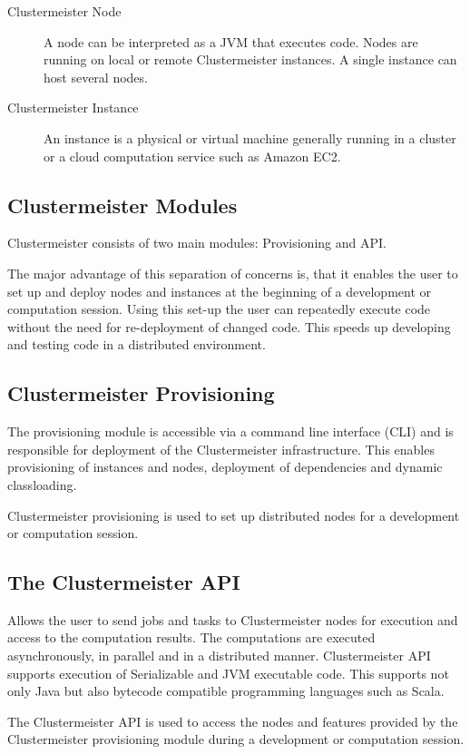 \documentclass{article}
\begin{document}
\begin{description}
\item[Clustermeister Node] A node can be interpreted as a JVM that executes code. Nodes are running on local or remote Clustermeister instances. A single instance can host several nodes.
\item[Clustermeister Instance] An instance is a physical or virtual machine generally running in a cluster or a cloud computation service such as Amazon EC2.
\end{description}

\subsection{Clustermeister Modules}

Clustermeister consists of two main modules: Provisioning and API.

The major advantage of this separation of concerns is, that it enables the user to set up and deploy nodes and instances at the beginning of a development or computation session. Using this set-up the user can repeatedly execute code without the need for re-deployment of changed code. This speeds up developing and testing code in a distributed environment.

\subsection{Clustermeister Provisioning}
The provisioning module is accessible via a command line interface (CLI) and is responsible for deployment of the Clustermeister infrastructure. This enables provisioning of instances and nodes, deployment of dependencies and dynamic classloading.

Clustermeister provisioning is used to set up distributed nodes for a development or computation session.

\subsection{The Clustermeister API}
Allows the user to send jobs and tasks to Clustermeister nodes for execution and access to the computation results. The computations are executed asynchronously, in parallel and in a distributed manner. Clustermeister API supports execution of Serializable and JVM executable code. This supports not only Java but also bytecode compatible programming languages such as Scala.

The Clustermeister API is used to access the nodes and features provided by the Clustermeister provisioning module during a development or computation session.
\end{document}
